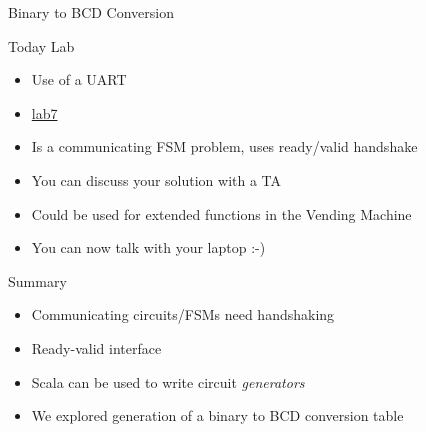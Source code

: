 \begin{frame}[fragile]{Binary to BCD Conversion}
\end{frame}

\begin{frame}[fragile]{Today Lab}
\begin{itemize}
\item Use of a UART
\item \href{https://github.com/schoeberl/chisel-lab/tree/master/lab7}{lab7}
\item Is a communicating FSM problem, uses ready/valid handshake
\item You can discuss your solution with a TA
\item Could be used for extended functions in the Vending Machine
\item You can now talk with your laptop :-)
\end{itemize}
\end{frame}


\begin{frame}[fragile]{Summary}
\begin{itemize}
\item Communicating circuits/FSMs need handshaking
\item Ready-valid interface
\item Scala can be used to write circuit \emph{generators}
\item We explored generation of a binary to BCD conversion table
\end{itemize}
\end{frame}





